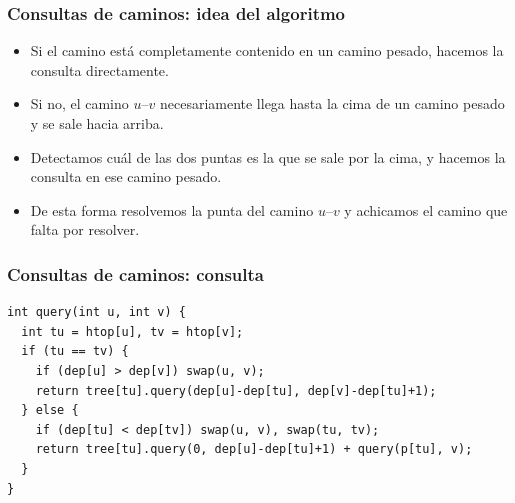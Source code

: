 

\begin{frame}
  \frametitle{Consultas de caminos: idea del algoritmo}

  \begin{itemize}
    \item Si el camino está completamente contenido en un camino pesado, hacemos la consulta directamente.
    \item Si no, el camino \(u\)--\(v\) necesariamente llega hasta la cima de un camino pesado y se sale hacia arriba.
    \item Detectamos cuál de las dos puntas es la que se sale por la cima, y hacemos la consulta en ese camino pesado.
    \item De esta forma resolvemos la punta del camino \(u\)--\(v\) y achicamos el camino que falta por resolver.
  \end{itemize}

  \vspace{0.75em}

\end{frame}

\begin{frame}[fragile]
  \frametitle{Consultas de caminos: consulta}

\begin{lstlisting}
int query(int u, int v) {
  int tu = htop[u], tv = htop[v];
  if (tu == tv) {
    if (dep[u] > dep[v]) swap(u, v);
    return tree[tu].query(dep[u]-dep[tu], dep[v]-dep[tu]+1);
  } else {
    if (dep[tu] < dep[tv]) swap(u, v), swap(tu, tv);
    return tree[tu].query(0, dep[u]-dep[tu]+1) + query(p[tu], v);
  }
}
\end{lstlisting}
\end{frame}